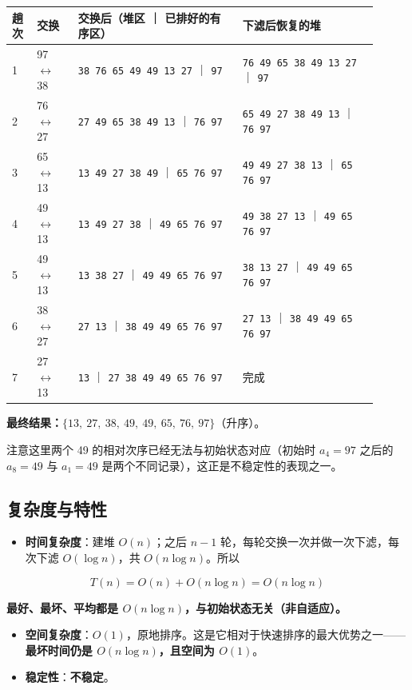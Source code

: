 \documentclass[11pt,openany,UTF8]{ctexbook}
\begin{document}
\begingroup\small\setlength{\tabcolsep}{4.0pt}
\begin{longtable}{@{}L{0.0672\linewidth}L{0.1071\linewidth}L{0.4032\linewidth}L{0.3339\linewidth}@{}}
\toprule
\textbf{趟次} & \textbf{交换} & \textbf{交换后（堆区 ｜ 已排好的有序区）} & \textbf{下滤后恢复的堆} \\
\midrule
{} & 97 $\leftrightarrow$ 38 & \texttt{38 76 65 49 49 13 27} ｜ \texttt{97} & \texttt{76 49 65 38 49 13 27} ｜ \texttt{97} \\
2 & 76 $\leftrightarrow$ 27 & \texttt{27 49 65 38 49 13} ｜ \texttt{76 97} & \texttt{65 49 27 38 49 13} ｜ \texttt{76 97} \\
3 & 65 $\leftrightarrow$ 13 & \texttt{13 49 27 38 49} ｜ \texttt{65 76 97} & \texttt{49 49 27 38 13} ｜ \texttt{65 76 97} \\
4 & 49 $\leftrightarrow$ 13 & \texttt{13 49 27 38} ｜ \texttt{49 65 76 97} & \texttt{49 38 27 13} ｜ \texttt{49 65 76 97} \\
5 & 49 $\leftrightarrow$ 13 & \texttt{13 38 27} ｜ \texttt{49 49 65 76 97} & \texttt{38 13 27} ｜ \texttt{49 49 65 76 97} \\
6 & 38 $\leftrightarrow$ 27 & \texttt{27 13} ｜ \texttt{38 49 49 65 76 97} & \texttt{27 13} ｜ \texttt{38 49 49 65 76 97} \\
7 & 27 $\leftrightarrow$ 13 & \texttt{13} ｜ \texttt{27 38 49 49 65 76 97} & 完成 \\
\bottomrule
\end{longtable}
\endgroup

\textbf{最终结果：$\{13,\ 27,\ 38,\ 49,\ 49,\ 65,\ 76,\ 97\}$}（升序）。

注意这里两个 49 的相对次序已经无法与初始状态对应（初始时 $a_4=97$ 之后的 $a_8=49$ 与 $a_1=49$ 是两个不同记录），这正是不稳定性的表现之一。

\subsection{复杂度与特性}

\begin{itemize}
\item \textbf{时间复杂度}：建堆 $O(n)$；之后 $n-1$ 轮，每轮交换一次并做一次下滤，每次下滤 $O(\log n)$，共 $O(n\log n)$。所以
\end{itemize}
\[T(n)=O(n)+O(n\log n)=O(n\log n)\]

\textbf{最好、最坏、平均都是 $O(n\log n)$，与初始状态无关（非自适应）。}

\begin{itemize}
\item \textbf{空间复杂度}：$O(1)$，原地排序。这是它相对于快速排序的最大优势之一——\textbf{最坏时间仍是 $O(n\log n)$，且空间为 $O(1)$}。
\item \textbf{稳定性}：\textbf{不稳定}。
\end{itemize}
\end{document}
